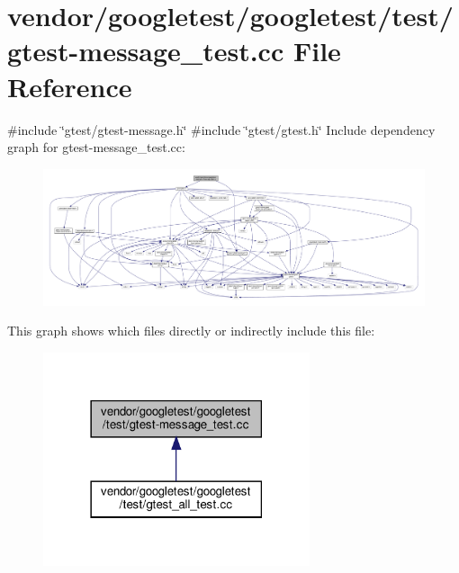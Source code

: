 \hypertarget{gtest-message__test_8cc}{}\section{vendor/googletest/googletest/test/gtest-\/message\+\_\+test.cc File Reference}
\label{gtest-message__test_8cc}
{\ttfamily \#include \char`\"{}gtest/gtest-\/message.\+h\char`\"{}}\newline
{\ttfamily \#include \char`\"{}gtest/gtest.\+h\char`\"{}}\newline
Include dependency graph for gtest-\/message\+\_\+test.cc\+:
\nopagebreak
\begin{figure}[H]
\begin{center}
\leavevmode
\includegraphics[width=350pt]{gtest-message__test_8cc__incl}
\end{center}
\end{figure}
This graph shows which files directly or indirectly include this file\+:
\nopagebreak
\begin{figure}[H]
\begin{center}
\leavevmode
\includegraphics[width=222pt]{gtest-message__test_8cc__dep__incl}
\end{center}
\end{figure}
